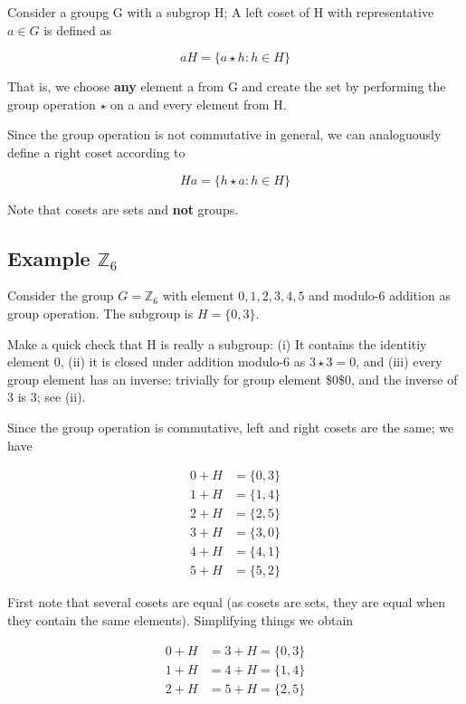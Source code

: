 
Consider a groupg G with a subgrop H; A left coset of H with
representative \(a \in G\) is defined as

\[
aH = \{a \star h: h \in H \}
\]

That is, we choose \textbf{any} element a from G and create the set by
performing the group operation \(\star\) on a and every element from H.

Since the group operation is not commutative in general, we can
analoguously define a right coset according to

\[
Ha = \{h \star a : h \in H \}
\]

Note that cosets are sets and \textbf{not} groups.

\subsection{Example $\mathbb{Z}_6$}\label{example-mathbbz_6}

Consider the group \(G = \mathbb{Z}_6\) with element \(0,1,2,3,4,5\) and
modulo-6 addition as group operation. The subgroup is \(H = \{0,3\}\).

Make a quick check that H is really a subgroup: (i) It contains the
identitiy element \(0\), (ii) it is closed under addition modulo-6 as
\(3 \star 3 = 0\), and (iii) every group element has an inverse:
trivially for group element \$0\$0, and the inverse of \(3\) is \(3\);
see (ii).

Since the group operation is commutative, left and right cosets are the
same; we have

\begin{align*}
0 + H &= \{0,3\} \\
1 + H &= \{1,4\} \\
2 + H &= \{2,5\} \\
3 + H &= \{3,0\} \\
4 + H &= \{4,1\} \\
5 + H &= \{5,2\}
\end{align*}


First note that several cosets are equal (as cosets are sets, they are
equal when they contain the same elements). Simplifying things we obtain


\begin{align*}
0 + H &= 3 + H = \{0,3\} \\
1 + H &= 4 + H = \{1,4\} \\
2 + H &= 5 + H = \{2,5\} \\
\end{align*}



